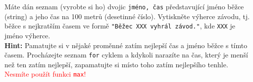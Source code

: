 \question[50]
Máte dán seznam (vyrobte si ho) dvojic \texttt{jméno, čas} představující jméno
běžce (string) a jeho čas na 100 metrů (desetinné číslo). Vytiskněte výherce
závodu, tj. běžce s nejkratším
časem ve formě \texttt{"Běžec XXX vyhrál
	závod."}, kde \texttt{XXX} je jméno
výherce.\\
\textbf{Hint:} Pamatujte si v nějaké proměnné zatím nejlepší čas a jméno běžce s
tímto časem. Procházejte
seznam \texttt{for} cyklem a kdykoli narazíte na čas, který je menší než ten
zatím nejlepší, zapamatujte si místo toho zatím nejlepšího tenhle.\\
\textcolor{red}{Nesmíte použít funkci \texttt{max}!}